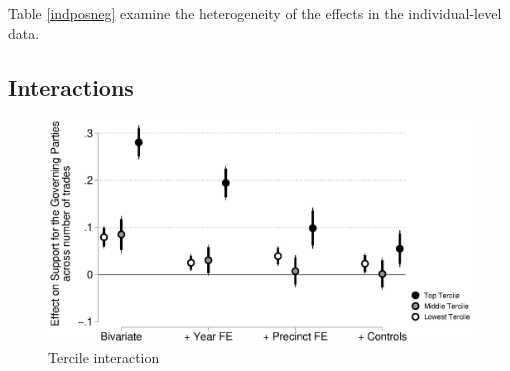 \documentclass[12pt,a4paper]{article}
\begin{document}
	
	Table \ref{indposneg} examine the heterogeneity of the effects in the individual-level data.
	
	
%	
	
	
	\subsection{Interactions}
	
	\begin{figure}
		\includegraphics[width=1\textwidth]{../figures/localactivity_sup.eps}
		\caption{Tercile interaction}
	\end{figure}
	

	
\end{document}
